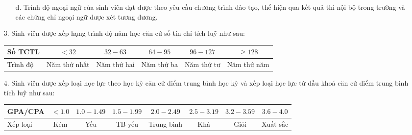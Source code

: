 \begin{itemize}
\begin{itemize}
			\item[d.] Trình độ ngoại ngữ của sinh viên đạt được theo yêu cầu chương trình đào tạo, thể hiện qua kết quả thi nội bộ trong trường và các chứng chỉ ngoại ngữ được xét tương đương.
		\end{itemize}
	\item[3.] Sinh viên được xếp hạng trình độ năm học căn cứ số tín chỉ tích luỹ như sau:
    \begin{table}[h!]
      \begin{tabular}{|l|c|c|c|c|c|}
          \hline
          Số TCTL  & $<32$        & $32-63$     & $64-95$    & $96-127$   & $\geq 128$  \\
          \hline
          Trình độ & Năm thứ nhất & Năm thứ hai & Năm thứ ba & Năm thứ tư & Năm thứ năm \\
          \hline
        \end{tabular}   
    \end{table}	
	\item[4.] Sinh viên được xếp loại học lực theo học kỳ căn cứ điểm trung bình học kỳ và xếp loại học lực từ đầu khoá căn cứ điểm trung bình tích luỹ như sau:
    \begin{table}[h!]
      \begin{tabular}{|l|c|c|c|c|c|c|c|}
          \hline
          GPA/CPA  & $<1.0$ & $1.0-1.49$ & $1.5-1.99$ & $2.0-2.49$ & $2.5-3.19$ & $3.2-3.59$ & $3.6-4.0$ \\
          \hline
          Xếp loại & Kém    & Yếu        & TB yếu     & Trung bình & Khá        & Giỏi       & Xuất sắc  \\
          \hline
        \end{tabular}
    \end{table}	
\end{itemize}


